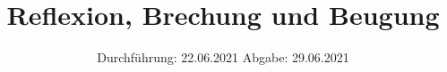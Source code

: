 

\subject{400}
\title{Reflexion, Brechung und Beugung}
\date{%
  Durchführung: 22.06.2021
  \hspace{3em}
  Abgabe: 29.06.2021
}



\maketitle
\thispagestyle{empty}
\tableofcontents
\newpage



%




\printbibliography{}



